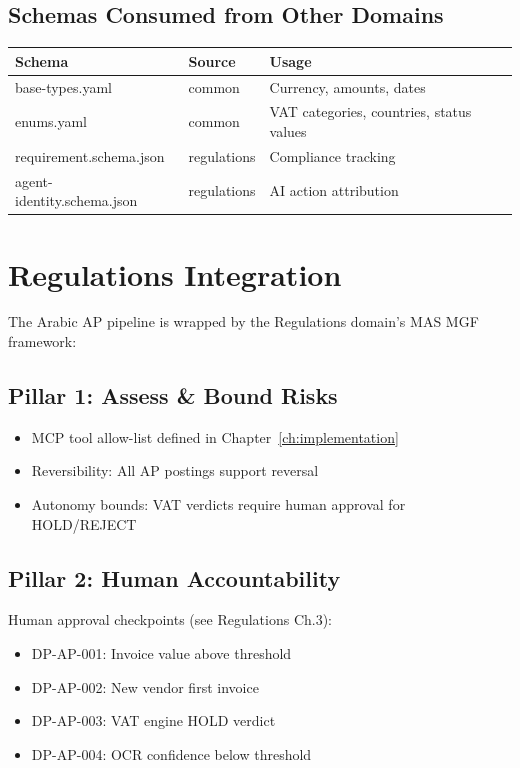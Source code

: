 \subsection{Schemas Consumed from Other Domains}

\begin{tabularx}{\linewidth}{@{}l l X@{}}
\toprule
\textbf{Schema} & \textbf{Source} & \textbf{Usage} \\
\midrule
base-types.yaml & common & Currency, amounts, dates \\
enums.yaml & common & VAT categories, countries, status values \\
requirement.schema.json & regulations & Compliance tracking \\
agent-identity.schema.json & regulations & AI action attribution \\
\bottomrule
\end{tabularx}

\section{Regulations Integration}
\label{sec:reg-integration}

The Arabic AP pipeline is wrapped by the Regulations domain's MAS MGF framework:

\subsection{Pillar 1: Assess \& Bound Risks}

\begin{itemize}
  \item MCP tool allow-list defined in Chapter~\ref{ch:implementation}
  \item Reversibility: All AP postings support reversal
  \item Autonomy bounds: VAT verdicts require human approval for HOLD/REJECT
\end{itemize}

\subsection{Pillar 2: Human Accountability}

Human approval checkpoints (see Regulations Ch.3):
\begin{itemize}
  \item DP-AP-001: Invoice value above threshold
  \item DP-AP-002: New vendor first invoice
  \item DP-AP-003: VAT engine HOLD verdict
  \item DP-AP-004: OCR confidence below threshold
\end{itemize}

